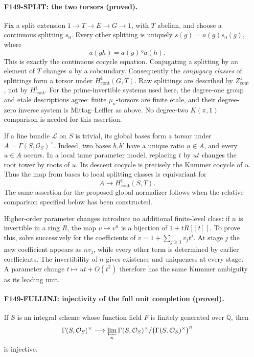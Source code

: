 \documentclass[11pt,a4paper]{article}
\theoremstyle{definition}
\begin{document}
\paragraph{F149-SPLIT: the two torsors (proved).}
Fix a split extension \(1\to T\to E\to G\to1\), with \(T\) abelian,
and choose a continuous splitting \(s_0\).  Every other splitting is
uniquely \(s(g)=a(g)s_0(g)\), where
\[
 a(gh)=a(g)\,{}^ga(h).
\]
This is exactly the continuous cocycle equation.  Conjugating a
splitting by an element of \(T\) changes \(a\) by a coboundary.
Consequently the \emph{conjugacy classes} of splittings form a torsor
under \(H^1_{\mathrm{cont}}(G,T)\).  Raw splittings are described by
\(Z^1_{\mathrm{cont}}\), not by \(H^1_{\mathrm{cont}}\).
For the prime-invertible systems used here, the degree-one group and
etale descriptions agree: finite \(\mu_n\)-torsors are finite etale,
and their degree-zero inverse system is Mittag--Leffler as above.
No degree-two \(K(\pi,1)\) comparison is needed for this assertion.

If a line bundle \(\mathcal L\) on \(S\) is trivial, its global bases form
a torsor under \(A=\Gamma(S,\mathcal O_S)^\times\).  Indeed, two bases
\(b,b'\) have a unique ratio \(u\in A\), and every \(u\in A\) occurs.
In a local tame parameter model, replacing \(t\) by \(ut\) changes the
root tower by roots of \(u\).  Its descent cocycle is precisely the
Kummer cocycle of \(u\).  Thus the map from bases to local splitting
classes is equivariant for
\[
 A\longrightarrow H^1_{\mathrm{cont}}(S,T).
\]
The same assertion for the proposed global normalizer follows when the
relative comparison specified below has been constructed.

Higher-order parameter changes introduce no additional finite-level
class: if \(n\) is invertible in a ring \(R\), the map
\(v\mapsto v^n\) is a bijection of \(1+tR[[t]]\).
To prove this, solve successively for the coefficients of
\(v=1+\sum_{j\geq1}v_jt^j\).  At stage \(j\) the new coefficient appears
as \(nv_j\), while every other term is determined by earlier
coefficients.  The invertibility of \(n\) gives existence and uniqueness
at every stage.  A parameter change \(t\mapsto ut+O(t^2)\) therefore has
the same Kummer ambiguity as its leading unit.

\paragraph{F149-FULLINJ: injectivity of the full unit completion (proved).}
If \(S\) is an integral scheme whose function field \(F\) is finitely
generated over \(\mathbb Q\), then
\[
 \Gamma(S,\mathcal O_S)^\times
 \longrightarrow
 \varprojlim_n\Gamma(S,\mathcal O_S)^\times/
       \bigl(\Gamma(S,\mathcal O_S)^\times\bigr)^n
\]
is injective.
\end{document}
